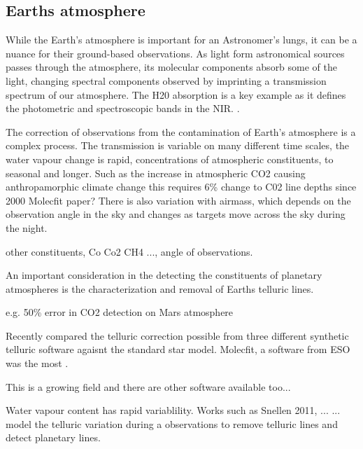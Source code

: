 \subsection{Earths atmosphere}
While the Earth's atmosphere is important for an Astronomer's lungs, it can be a nuance for their ground-based observations. As light form astronomical sources passes through the atmosphere, its molecular components absorb some of the light, changing spectral components observed  by imprinting a transmission spectrum of our atmosphere. The H20 absorption is a key example as it defines the photometric and spectroscopic bands in the NIR. .

The correction of observations from the contamination of Earth's atmosphere is a complex process. The transmission is variable on many different time scales, the water vapour change is rapid, concentrations of atmospheric constituents, to seasonal and longer. Such as the increase in atmospheric CO2 causing anthropamorphic climate change this requires 6\% change to C02 line depths since 2000 Molecfit paper? There is also variation with airmass, which depends on the observation angle in the sky and changes as targets move across the sky during the night. 

other constituents, Co Co2 CH4 ..., angle of observations.

An important consideration in the detecting the constituents of planetary atmospheres is the characterization and removal of Earths telluric lines.

e.g. 50\% error in CO2 detection on Mars atmosphere


Recently \citet{Ulmer-moll} compared the telluric correction possible from three different synthetic telluric software agaisnt the standard star model. Molecfit, a software from ESO was the most .

This is a growing field and there are other software available too... 


Water vapour content has rapid variablility. Works such as Snellen 2011, ... ...  model the telluric variation during a observations to remove telluric lines and detect planetary lines.

